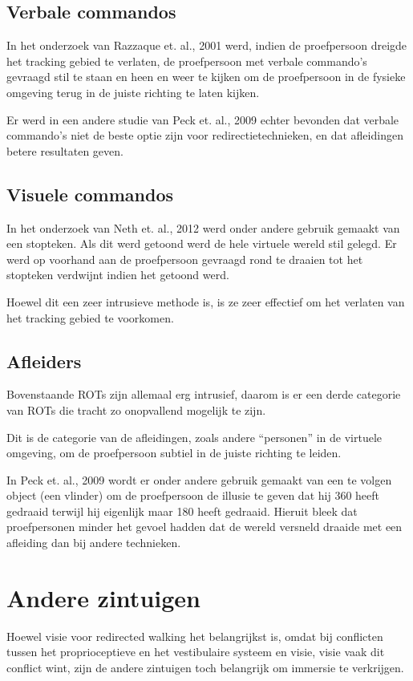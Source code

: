 \subsection{Verbale commandos}
In het onderzoek van Razzaque et. al., 2001 \cite{kohn01} werd, indien de
proefpersoon dreigde het tracking gebied te verlaten, de proefpersoon met verbale
commando's gevraagd stil te staan en heen en weer te kijken om de proefpersoon in
de fysieke omgeving terug in de juiste richting te laten kijken.

Er werd in een andere studie van Peck et. al., 2009 \cite{peck09} echter bevonden 
dat verbale commando's niet de beste optie zijn voor redirectietechnieken, en dat
afleidingen betere resultaten geven.


\subsection{Visuele commandos}
In het onderzoek van Neth et. al., 2012 \cite{neth12} werd onder andere gebruik 
gemaakt van een stopteken. Als dit werd getoond werd de hele virtuele wereld stil 
gelegd. Er werd op voorhand aan de proefpersoon gevraagd rond te draaien tot het 
stopteken verdwijnt indien het getoond werd.

Hoewel dit een zeer intrusieve methode is, is ze zeer effectief om het verlaten
van het tracking gebied te voorkomen.


\subsection{Afleiders}
Bovenstaande ROTs zijn allemaal erg intrusief, daarom is er een derde categorie
van ROTs die tracht zo onopvallend mogelijk te zijn.

Dit is de categorie van de afleidingen, zoals andere ``personen'' in de virtuele
omgeving\cite{neth12}, om de proefpersoon subtiel in de juiste richting te 
leiden.

In Peck et. al., 2009 \cite{peck09} wordt er onder andere gebruik gemaakt van een 
te volgen object (een vlinder) om de proefpersoon de illusie te geven dat hij 
\mbox{360\textdegree} heeft gedraaid terwijl hij eigenlijk maar 180\textdegree{}
heeft gedraaid. Hieruit bleek dat proefpersonen minder het gevoel hadden dat de
wereld versneld draaide met een afleiding dan bij andere technieken.


\section{Andere zintuigen}
Hoewel visie voor redirected walking het belangrijkst is, omdat bij conflicten
tussen het proprioceptieve en het vestibulaire systeem en visie, visie vaak dit
conflict wint\cite{berthoz02,dichgans78,bruder08}, zijn de andere zintuigen toch
belangrijk om immersie te verkrijgen. 

